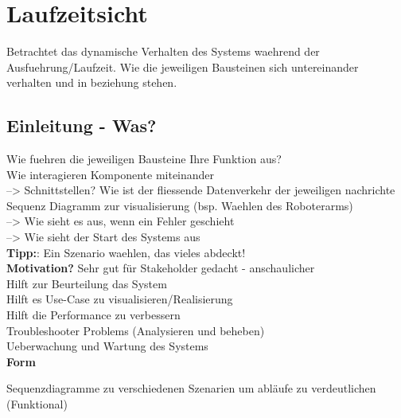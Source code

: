 \chapter{Laufzeitsicht}

Betrachtet das dynamische Verhalten des Systems waehrend der Ausfuehrung/Laufzeit.
Wie die jeweiligen Bausteinen sich untereinander verhalten und in beziehung stehen. 

\section{Einleitung - Was?}

Wie fuehren die jeweiligen Bausteine Ihre Funktion aus?\\
Wie interagieren Komponente miteinander\\
 --> Schnittstellen? 
Wie ist der fliessende Datenverkehr der jeweiligen nachrichte\\
Sequenz Diagramm zur visualisierung (bsp. Waehlen des Roboterarms)\\
 --> Wie sieht es aus, wenn ein Fehler geschieht\\
 --> Wie sieht der Start des Systems aus\\

 \textbf{Tipp:}:
 Ein Szenario waehlen, das vieles abdeckt!\\

 \textbf{Motivation?}
 Sehr gut für Stakeholder gedacht - anschaulicher\\
 Hilft zur Beurteilung das System\\
 Hilft es Use-Case zu visualisieren/Realisierung\\
 Hilft die Performance zu verbessern\\
 Troubleshooter Problems (Analysieren und beheben)\\
 Ueberwachung und Wartung des Systems\\
 


\textbf{Form}





Sequenzdiagramme zu verschiedenen Szenarien um abläufe zu verdeutlichen (Funktional)




